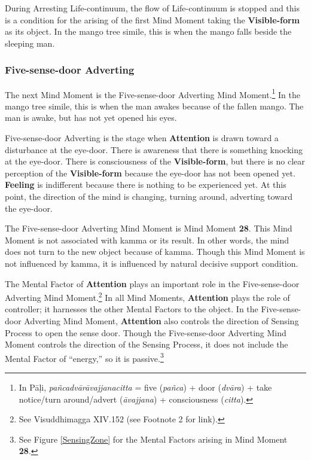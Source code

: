 During Arresting Life-continuum, the flow of Life-continuum is stopped and this is a condition for the arising of the first Mind Moment taking the \textbf{Visible-form} as its object. In the mango tree simile, this is when the mango falls beside the sleeping man.

\subsubsection*{Five-sense-door Adverting}

The next Mind Moment is the Five-sense-door Adverting Mind Moment.\footnote{In Pāḷi, \textit{pañcadvārāvajjanacitta} = five (\textit{pañca}) + door (\textit{dvāra}) + take notice/turn around/advert (\textit{āvajjana}) + consciousness (\textit{citta}).} In the mango tree simile, this is when the man awakes because of the fallen mango. The man is awake, but has not yet opened his eyes. 

Five-sense-door Adverting is the stage when \textbf{Attention} is drawn toward a disturbance at the eye-door. There is awareness that there is something knocking at the eye-door. There is consciousness of the \textbf{Visible-form}, but there is no clear perception of the \textbf{Visible-form} because the eye-door has not been opened yet. \textbf{Feeling} is indifferent because there is nothing to be experienced yet. At this point, the direction of the mind is changing, turning around, adverting toward the eye-door.

The Five-sense-door Adverting Mind Moment is Mind Moment \textbf{28}. This Mind Moment is not associated with kamma or its result. In other words, the mind does not turn to the new object because of kamma. Though this Mind Moment is not influenced by kamma, it is influenced by natural decisive support condition.

The Mental Factor of \textbf{Attention} plays an important role in the Five-sense-door Adverting Mind Moment.\footnote{See Visuddhimagga XIV.152 (see Footnote 2 for link).} In all Mind Moments, \textbf{Attention} plays the role of controller; it harnesses the other Mental Factors to the object. In the Five-sense-door Adverting Mind Moment, \textbf{Attention} also controls the direction of Sensing Process to open the sense door. Though the Five-sense-door Adverting Mind Moment controls the direction of the Sensing Process, it does not include the Mental Factor of “energy,” so it is passive.\footnote{See Figure \ref{SensingZone} for the Mental Factors arising in Mind Moment \textbf{28}.}

